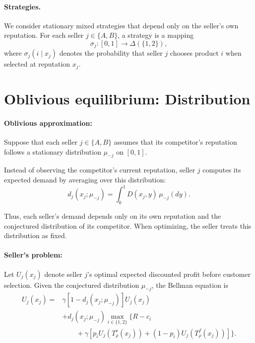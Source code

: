 \documentclass[11pt]{article}
\begin{document}
\paragraph{Strategies.}
We consider stationary mixed strategies that depend only
on the seller's own reputation. For each seller $j\in\{A,B\}$,
a strategy is a mapping
\begin{equation}
\sigma_j:[0,1]\rightarrow\Delta(\{1,2\}),
\end{equation}
where $\sigma_j(i\mid x_j)$ denotes the probability that
seller $j$ chooses product $i$ when selected at reputation
$x_j$.

\section{Oblivious equilibrium: Distribution}

\paragraph{Oblivious approximation:}
Suppose that each seller $j\in\{A,B\}$ assumes that
its competitor's reputation follows a stationary distribution
$\mu_{-j}$ on $[0,1]$.

Instead of observing the competitor's current reputation,
seller $j$ computes its expected demand by averaging over
this distribution:
\begin{equation}
d_j(x_j;\mu_{-j})
=
\int_0^1 D(x_j,y)\,\mu_{-j}(dy).
\end{equation}

Thus, each seller's demand depends only on its own reputation
and the conjectured distribution of its competitor.
When optimizing, the seller treats this distribution as fixed.

\paragraph{Seller's problem:}
Let $U_j(x_j)$ denote seller $j$'s optimal expected discounted
profit before customer selection. Given the conjectured distribution $\mu_{-j}$, the Bellman equation is
\begin{equation}
\begin{aligned}
U_j(x_j) ={}& \gamma[1-d_j(x_j;\mu_{-j})]U_j(x_j)\\ &+ d_j(x_j;\mu_{-j})
\max_{i\in\{1,2\}}\Big\{ R-c_i\\
&\qquad+\gamma\left[ p_i U_j(T_\rho^s(x_j)) + (1-p_i)U_j(T_\rho^f(x_j))
\right] \Big\}.
\end{aligned}
\end{equation}
\end{document}
